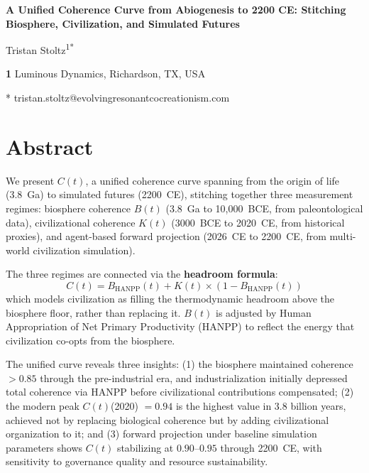 \documentclass[10pt,letterpaper]{article}
\newcommand{\bt}{$B(t)$}
\newcommand{\kt}{$K(t)$}
\newcommand{\ct}{$C(t)$}
\begin{document}
\vspace*{0.2in}

\begin{flushleft}
{\Large\textbf{A Unified Coherence Curve from Abiogenesis to 2200 CE: Stitching Biosphere, Civilization, and Simulated Futures}}
\bigskip

Tristan Stoltz\textsuperscript{1*}

\bigskip

\textbf{1} Luminous Dynamics, Richardson, TX, USA

\bigskip

* tristan.stoltz@evolvingresonantcocreationism.com

\end{flushleft}

\section*{Abstract}

We present \ct{}, a unified coherence curve spanning from the origin
of life (3.8~Ga) to simulated futures (2200~CE), stitching together
three measurement regimes: biosphere coherence \bt{} (3.8~Ga to
10,000~BCE, from paleontological data), civilizational coherence \kt{}
(3000~BCE to 2020~CE, from historical proxies), and agent-based forward
projection (2026~CE to 2200~CE, from multi-world civilization simulation).

The three regimes are connected via the \textbf{headroom formula}:
\begin{equation*}
C(t) = B_{\text{HANPP}}(t) + K(t) \times (1 - B_{\text{HANPP}}(t))
\end{equation*}
which models civilization as filling the thermodynamic headroom above
the biosphere floor, rather than replacing it. \bt{} is adjusted by
Human Appropriation of Net Primary Productivity (HANPP) to reflect
the energy that civilization co-opts from the biosphere.

The unified curve reveals three insights: (1) the biosphere maintained
coherence $> 0.85$ through the pre-industrial era, and industrialization
initially depressed total coherence via HANPP before civilizational
contributions compensated; (2) the modern peak \ct{}(2020) $= 0.94$ is
the highest value in 3.8 billion years, achieved not by replacing
biological coherence but by adding civilizational organization to it;
and (3) forward projection under baseline simulation parameters shows
\ct{} stabilizing at $0.90$--$0.95$ through 2200~CE, with sensitivity
to governance quality and resource sustainability.
\end{document}
